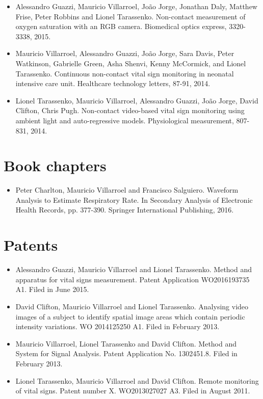 \begin{itemize}
    \item Alessandro Guazzi, Mauricio Villarroel, Jo\~{a}o Jorge, Jonathan Daly, Matthew Frise,  Peter Robbins and Lionel Tarassenko. Non-contact measurement of oxygen saturation with an RGB camera. Biomedical optics express, 3320-3338, 2015.

    \item Mauricio Villarroel, Alessandro Guazzi, Jo\~{a}o Jorge, Sara Davis,  Peter Watkinson, Gabrielle Green, Asha Shenvi, Kenny McCormick, and Lionel Tarassenko. Continuous non-contact vital sign monitoring in neonatal intensive care unit. Healthcare technology letters, 87-91,  2014.

    \item Lionel Tarassenko, Mauricio Villarroel, Alessandro Guazzi, Jo\~{a}o Jorge, David Clifton, Chris Pugh. Non-contact video-based vital sign monitoring using ambient light and auto-regressive models. Physiological measurement, 807-831, 2014.
   
\end{itemize}

\section*{Book chapters}

\begin{itemize}

    \item Peter Charlton, Mauricio Villarroel and Francisco Salguiero. Waveform Analysis to Estimate Respiratory Rate. In Secondary Analysis of Electronic Health Records, pp. 377-390. Springer International Publishing,  2016.
   
\end{itemize}

\section*{Patents}

\begin{itemize}

    \item Alessandro Guazzi, Mauricio Villarroel and Lionel Tarassenko. Method and apparatus for vital signs measurement.  Patent Application WO2016193735 A1. Filed in June 2015.

    \item David Clifton, Mauricio Villarroel and Lionel Tarassenko.  Analysing video images of a subject to identify spatial image areas which contain periodic intensity variations. WO 2014125250 A1.  Filed in February 2013.
        
    \item Mauricio Villarroel, Lionel Tarassenko and David Clifton. Method and System for Signal Analysis.  Patent Application No. 1302451.8. Filed in February 2013.

    \item Lionel Tarassenko, Mauricio Villarroel and David Clifton. Remote monitoring of vital signs. Patent number X. WO2013027027 A3. Filed in August 2011.

\end{itemize}

